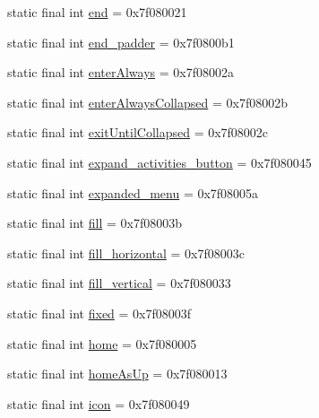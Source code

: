 \begin{CompactItemize}
static final int \hyperlink{classandroid_1_1support_1_1v7_1_1palette_1_1_r_1_1id_5a606a429e30ec96c428089a01395983}{end} = 0x7f080021
\item 
static final int \hyperlink{classandroid_1_1support_1_1v7_1_1palette_1_1_r_1_1id_197e8627cac047e589b09fb1fd84dcaf}{end\_\-padder} = 0x7f0800b1
\item 
static final int \hyperlink{classandroid_1_1support_1_1v7_1_1palette_1_1_r_1_1id_8534e8dbd5018090e7144782f17d19cc}{enterAlways} = 0x7f08002a
\item 
static final int \hyperlink{classandroid_1_1support_1_1v7_1_1palette_1_1_r_1_1id_9aada7d11225956e819e077e5f4b28dc}{enterAlwaysCollapsed} = 0x7f08002b
\item 
static final int \hyperlink{classandroid_1_1support_1_1v7_1_1palette_1_1_r_1_1id_6f6f4bfd393a27c02ec32f9d0fea1813}{exitUntilCollapsed} = 0x7f08002c
\item 
static final int \hyperlink{classandroid_1_1support_1_1v7_1_1palette_1_1_r_1_1id_85ebb77ccbf764e6109582fabeb390f4}{expand\_\-activities\_\-button} = 0x7f080045
\item 
static final int \hyperlink{classandroid_1_1support_1_1v7_1_1palette_1_1_r_1_1id_ac837827b42792992d5b1f5c993c0b9c}{expanded\_\-menu} = 0x7f08005a
\item 
static final int \hyperlink{classandroid_1_1support_1_1v7_1_1palette_1_1_r_1_1id_6579bc846ab68000649b3d8e33a8cf81}{fill} = 0x7f08003b
\item 
static final int \hyperlink{classandroid_1_1support_1_1v7_1_1palette_1_1_r_1_1id_5b51c4adb5deda72890fe1156ba1e3dd}{fill\_\-horizontal} = 0x7f08003c
\item 
static final int \hyperlink{classandroid_1_1support_1_1v7_1_1palette_1_1_r_1_1id_1f8a043844a286ef240eb2be2ba0c433}{fill\_\-vertical} = 0x7f080033
\item 
static final int \hyperlink{classandroid_1_1support_1_1v7_1_1palette_1_1_r_1_1id_488c2ac4cc4405d8818c4155389b869a}{fixed} = 0x7f08003f
\item 
static final int \hyperlink{classandroid_1_1support_1_1v7_1_1palette_1_1_r_1_1id_c0adc1b664d54781e62da911f71fe1f4}{home} = 0x7f080005
\item 
static final int \hyperlink{classandroid_1_1support_1_1v7_1_1palette_1_1_r_1_1id_ef5b9b1f23963786d879ecdb93516bba}{homeAsUp} = 0x7f080013
\item 
static final int \hyperlink{classandroid_1_1support_1_1v7_1_1palette_1_1_r_1_1id_7b888a57ccbbeb710251642d6ec897e2}{icon} = 0x7f080049

\end{CompactItemize}
